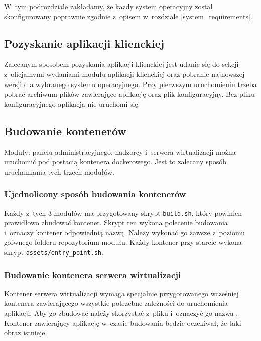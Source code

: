 \documentclass[../opis-rozwiazania.tex]{subfiles}
\begin{document}
\label{system_startup}

W~tym podrozdziale zakładamy, że każdy system operacyjny został skonfigurowany poprawnie zgodnie z~opisem w~rozdziale \ref{system_requirements}.

\subsection{Pozyskanie aplikacji klienckiej}
\label{system_startup.client_obtaining}
Zalecanym sposobem pozyskania aplikacji klienckiej jest udanie się do sekcji z~oficjalnymi wydaniami \parencite{ocd-client-releases} modułu aplikacji klienckiej oraz pobranie najnowszej wersji dla wybranego systemu operacyjnego.
Przy pierwszym uruchomieniu trzeba pobrać archiwum plików zawierające aplikację oraz plik konfiguracyjny.
Bez pliku konfiguracyjnego aplikacja nie uruchomi się.

\subsection{Budowanie kontenerów}
\label{system_startup.containers}

Moduły: panelu administracyjnego, nadzorcy i~serwera wirtualizacji można uruchomić pod postacią kontenera dockerowego.
Jest to zalecany sposób uruchamiania tych trzech modułów.

\subsubsection{Ujednolicony sposób budowania kontenerów}
Każdy z~tych 3 modułów ma przygotowany skrypt \texttt{build.sh}, który powinien prawidłowo zbudować kontener.
Skrypt ten wykona polecenie budowania i~oznaczy kontener odpowiednią nazwą.
Należy wykonać go zawsze z~poziomu głównego folderu repozytorium modułu.
Każdy kontener przy starcie wykona skrypt \texttt{assets/entry\_point.sh}.

\subsubsection{Budowanie kontenera serwera wirtualizacji}
Kontener serwera wirtualizacji wymaga specjalnie przygotowanego wcześniej kontenera zawierającego wszystkie potrzebne zależności do uruchomienia aplikacji.
Aby go zbudować należy skorzystać z~pliku \texttt{} i~oznaczyć go nazwą \texttt{}.
Kontener zawierający aplikację w~czasie budowania będzie oczekiwał, że taki obraz istnieje.
\end{document}

